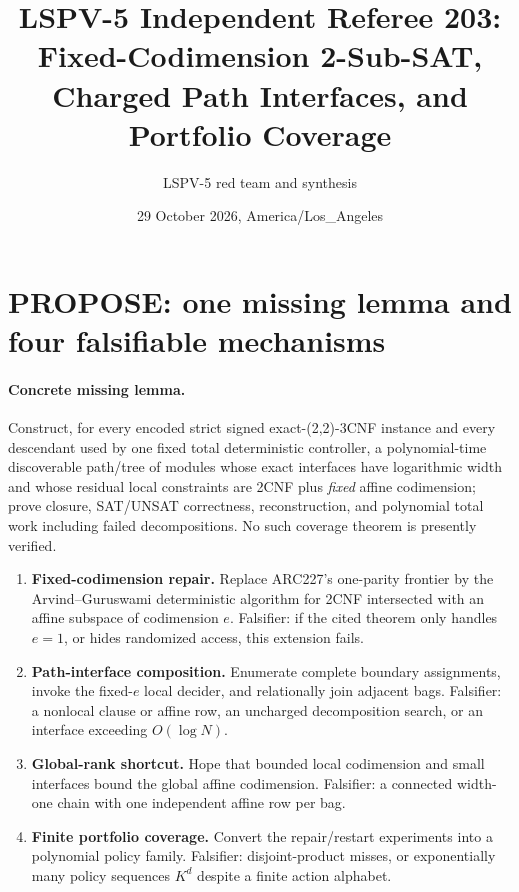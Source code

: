 \documentclass[10pt]{article}
\title{LSPV-5 Independent Referee 203:\\Fixed-Codimension 2-Sub-SAT, Charged Path Interfaces, and Portfolio Coverage}
\author{LSPV-5 red team and synthesis}
\date{29 October 2026, America/Los\_Angeles}
\begin{document}
\sloppy
\maketitle

\begin{center}
\end{center}

\section{PROPOSE: one missing lemma and four falsifiable mechanisms}

\paragraph{Concrete missing lemma.}
Construct, for every encoded strict signed exact-(2,2)-3CNF instance and every descendant
used by one fixed total deterministic controller, a polynomial-time discoverable path/tree of
modules whose exact interfaces have logarithmic width and whose residual local constraints
are 2CNF plus \emph{fixed} affine codimension; prove closure, SAT/UNSAT correctness,
reconstruction, and polynomial total work including failed decompositions.  No such coverage
theorem is presently verified.

\begin{enumerate}
\item \textbf{Fixed-codimension repair.}  Replace ARC227's one-parity frontier by the
Arvind--Guruswami deterministic algorithm for 2CNF intersected with an affine subspace of
codimension $e$.  Falsifier: if the cited theorem only handles $e=1$, or hides randomized
access, this extension fails.
\item \textbf{Path-interface composition.}  Enumerate complete boundary assignments, invoke
the fixed-$e$ local decider, and relationally join adjacent bags.  Falsifier: a nonlocal clause
or affine row, an uncharged decomposition search, or an interface exceeding $O(\log N)$.
\item \textbf{Global-rank shortcut.}  Hope that bounded local codimension and small interfaces
bound the global affine codimension.  Falsifier: a connected width-one chain with one
independent affine row per bag.
\item \textbf{Finite portfolio coverage.}  Convert the repair/restart experiments into a
polynomial policy family.  Falsifier: disjoint-product misses, or exponentially many policy
sequences $K^d$ despite a finite action alphabet.
\end{enumerate}
\end{document}
